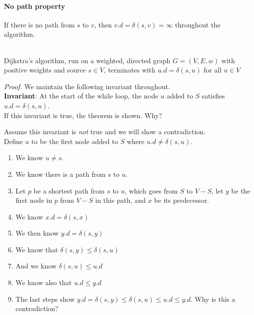 \documentclass[11  pt]{exam}
\begin{document}
	\paragraph{No path property}
	If there is no path from $s$ to $v$, then $v.d = \delta(s,v) = \infty$ throughout the algorithm. \\ \\
	
	
	\begin{theorem}
		Dijkstra's algorithm, run on a weighted, directed graph $G = (V,E,w)$ with positive weights and source $s \in V$, terminates with $u.d = \delta(s,u)$ for all $u \in V$
	\end{theorem}
	\textit{Proof.} We maintain the following invariant throughout. \\
	
	\textbf{Invariant}: At the start of the while loop, the node $u$ added to $S$ satisfies $u.d = \delta(s,u)$. \\
	
	If this invariant is true, the theorem is shown. Why?
	\newpage
	
	Assume this invariant is \emph{not} true and we will show a contradiction. \\
	
	Define $u$ to be the first node added to $S$ where $u.d \neq \delta(s,u)$.
	
	\begin{enumerate}
		\item We know $u \neq s$. \\
		\item We know there is a path from $s$ to $u$. \\
		\item Let $p$ be a shortest path from $s$ to $u$, which goes from $S$ to $V-S$, let $y$ be the first node in $p$ from $V-S$ in this path, and $x$ be its predecessor. \\ 
		\vs{4cm} 
		\item We know $x.d = \delta(s,x)$\\
		\item We then know $y.d = \delta(s,y)$ \\
		\item We know that $\delta(s,y) \leq \delta(s,u)$ \\
		
		\item And we know $\delta(s,u) \leq u.d$ \\
		\item We know also that $u.d \leq y.d$ \\
		\item The last steps show $y.d = \delta(s,y) \leq \delta(s,u) \leq u.d \leq y.d$. Why is this a contradiction?
	\end{enumerate}
	
\end{document}
